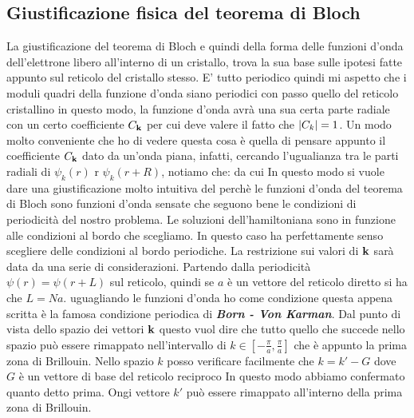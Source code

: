 \documentclass[a4paper,12pt]{article}
\begin{document}
\subsection{Giustificazione fisica del teorema di Bloch}
La giustificazione del teorema di Bloch e quindi della forma delle funzioni d'onda dell'elettrone libero all'interno di un cristallo, trova la sua base sulle ipotesi fatte appunto sul reticolo del cristallo stesso. E' tutto periodico quindi mi aspetto che i moduli quadri della funzione d'onda siano periodici con passo quello del reticolo cristallino
in questo modo, la funzione d'onda avrà una sua certa parte radiale con un certo coefficiente $C_{\it\bf k}$ per cui deve valere il fatto che $\abs{C_k} =1$. Un modo molto conveniente che ho di vedere questa cosa è quella di pensare appunto il coefficiente $C_{\it\bf k}$ dato da un'onda piana, infatti, cercando l'ugualianza tra le parti radiali di $\psi_k(r)$ r $\psi_k(r+R)$, notiamo che:
da cui
In questo modo si vuole dare una giustificazione molto intuitiva del perchè le funzioni d'onda del teorema di Bloch sono funzioni d'onda sensate che seguono bene le condizioni di periodicità del nostro problema. Le soluzioni dell'hamiltoniana sono in funzione alle condizioni al bordo che scegliamo. In questo caso ha perfettamente senso scegliere delle condizioni al bordo periodiche. La restrizione sui valori di $\it\bf k$ sarà data da una serie di considerazioni. Partendo dalla periodicità $\psi(r) = \psi(r+L)$ sul reticolo, quindi se $a$ è un vettore del reticolo diretto si ha che $L = Na$. uguagliando le funzioni d'onda
ho come condizione
questa appena scritta è la famosa condizione periodica di \textit{\textbf{Born - Von Karman}}. Dal punto di vista dello spazio dei vettori $\it\bf k$ questo vuol dire che tutto quello che succede nello spazio può essere rimappato nell'intervallo di $k\in\left[-\frac{\pi}{a},\frac{\pi}{a}\right]$ che è appunto la prima zona di Brillouin. Nello spazio $k$ posso verificare facilmente che $k = k'-G$ dove $G$ è un vettore di base del reticolo reciproco
In questo modo abbiamo confermato quanto detto prima. Ongi vettore $k'$ può essere rimappato all'interno della prima zona di Brillouin.
\end{document}
